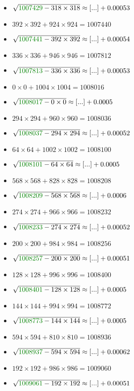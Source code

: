 \documentclass[12pt]{article}
\begin{document}
\begin{multicols}{2}
\begin{itemize}
\item $\sqrt{ {\color{green!50!black}{1007429}} - 318\times 318 } \approx [...] + 0.00053$
\item $392\times392 + 924\times924 = 1007440$
\item $\sqrt{ {\color{green!50!black}{1007441}} - 392\times 392 } \approx [...] + 0.00054$
\item $336\times336 + 946\times946 = 1007812$
\item $\sqrt{ {\color{green!50!black}{1007813}} - 336\times 336 } \approx [...] + 0.00053$
\item $0\times0 + 1004\times1004 = 1008016$
\item $\sqrt{ {\color{green!50!black}{1008017}} - 0\times 0 } \approx [...] + 0.0005$
\item $294\times294 + 960\times960 = 1008036$
\item $\sqrt{ {\color{green!50!black}{1008037}} - 294\times 294 } \approx [...] + 0.00052$
\item $64\times64 + 1002\times1002 = 1008100$
\item $\sqrt{ {\color{green!50!black}{1008101}} - 64\times 64 } \approx [...] + 0.0005$
\item $568\times568 + 828\times828 = 1008208$
\item $\sqrt{ {\color{green!50!black}{1008209}} - 568\times 568 } \approx [...] + 0.0006$
\item $274\times274 + 966\times966 = 1008232$
\item $\sqrt{ {\color{green!50!black}{1008233}} - 274\times 274 } \approx [...] + 0.00052$
\item $200\times200 + 984\times984 = 1008256$
\item $\sqrt{ {\color{green!50!black}{1008257}} - 200\times 200 } \approx [...] + 0.00051$
\item $128\times128 + 996\times996 = 1008400$
\item $\sqrt{ {\color{green!50!black}{1008401}} - 128\times 128 } \approx [...] + 0.0005$
\item $144\times144 + 994\times994 = 1008772$
\item $\sqrt{ {\color{green!50!black}{1008773}} - 144\times 144 } \approx [...] + 0.0005$
\item $594\times594 + 810\times810 = 1008936$
\item $\sqrt{ {\color{green!50!black}{1008937}} - 594\times 594 } \approx [...] + 0.00062$
\item $192\times192 + 986\times986 = 1009060$
\item $\sqrt{ {\color{green!50!black}{1009061}} - 192\times 192 } \approx [...] + 0.00051$

\end{itemize}
\end{multicols}
\end{document}
